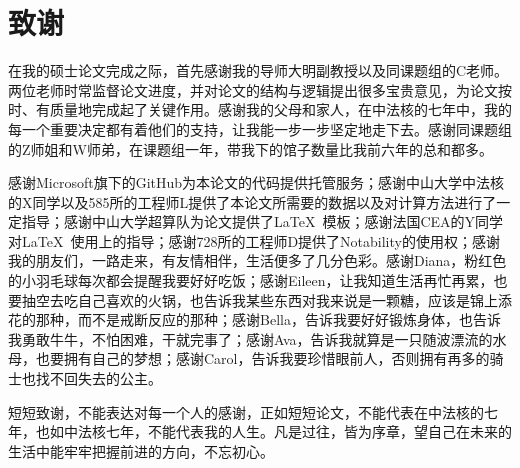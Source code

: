 
\chapter{致谢}

在我的硕士论文完成之际，首先感谢我的导师大明副教授以及同课题组的C老师。两位老师时常监督论文进度，并对论文的结构与逻辑提出很多宝贵意见，为论文按时、有质量地完成起了关键作用。感谢我的父母和家人，在中法核的七年中，我的每一个重要决定都有着他们的支持，让我能一步一步坚定地走下去。感谢同课题组的Z师姐和W师弟，在课题组一年，带我下的馆子数量比我前六年的总和都多。

感谢Microsoft旗下的GitHub为本论文的代码提供托管服务；感谢中山大学中法核的X同学以及585所的工程师L提供了本论文所需要的数据以及对计算方法进行了一定指导；感谢中山大学超算队为论文提供了\LaTeX\ 模板；感谢法国CEA的Y同学对\LaTeX\ 使用上的指导；感谢728所的工程师D提供了Notability的使用权；感谢我的朋友们，一路走来，有友情相伴，生活便多了几分色彩。感谢Diana，粉红色的小羽毛球每次都会提醒我要好好吃饭；感谢Eileen，让我知道生活再忙再累，也要抽空去吃自己喜欢的火锅，也告诉我某些东西对我来说是一颗糖，应该是锦上添花的那种，而不是戒断反应的那种；感谢Bella，告诉我要好好锻炼身体，也告诉我勇敢牛牛，不怕困难，干就完事了；感谢Ava，告诉我就算是一只随波漂流的水母，也要拥有自己的梦想；感谢Carol，告诉我要珍惜眼前人，否则拥有再多的骑士也找不回失去的公主。

短短致谢，不能表达对每一个人的感谢，正如短短论文，不能代表在中法核的七年，也如中法核七年，不能代表我的人生。凡是过往，皆为序章，望自己在未来的生活中能牢牢把握前进的方向，不忘初心。

